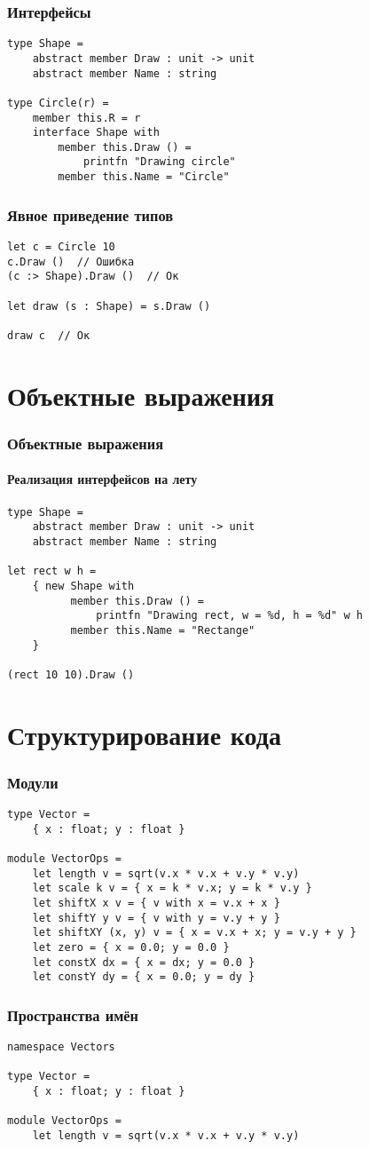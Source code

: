 \documentclass[xetex,mathserif,serif]{beamer}
\begin{document}
	\begin{frame}[fragile]
		\frametitle{Интерфейсы}
		\begin{verbatim}
type Shape =
    abstract member Draw : unit -> unit
    abstract member Name : string

type Circle(r) =
    member this.R = r
    interface Shape with
        member this.Draw () = 
            printfn "Drawing circle"
        member this.Name = "Circle"
		\end{verbatim}
\end{frame}

	\begin{frame}[fragile]
		\frametitle{Явное приведение типов}
		\begin{verbatim}
let c = Circle 10
c.Draw ()  // Ошибка
(c :> Shape).Draw ()  // Ок

let draw (s : Shape) = s.Draw ()

draw c  // Ок
		\end{verbatim}
\end{frame}

	\section{Объектные выражения}

	\begin{frame}[fragile]
		\frametitle{Объектные выражения}
		\framesubtitle{Реализация интерфейсов на лету}
		\begin{verbatim}
type Shape =
    abstract member Draw : unit -> unit
    abstract member Name : string

let rect w h = 
    { new Shape with
          member this.Draw () = 
              printfn "Drawing rect, w = %d, h = %d" w h
          member this.Name = "Rectange"
    }

(rect 10 10).Draw ()
		\end{verbatim}
\end{frame}

	\section{Структурирование кода}

	\begin{frame}[fragile]
		\frametitle{Модули}
		\begin{verbatim}
type Vector =
    { x : float; y : float }

module VectorOps =
    let length v = sqrt(v.x * v.x + v.y * v.y)
    let scale k v = { x = k * v.x; y = k * v.y }
    let shiftX x v = { v with x = v.x + x }
    let shiftY y v = { v with y = v.y + y }
    let shiftXY (x, y) v = { x = v.x + x; y = v.y + y }
    let zero = { x = 0.0; y = 0.0 }
    let constX dx = { x = dx; y = 0.0 }
    let constY dy = { x = 0.0; y = dy }
		\end{verbatim}
\end{frame}

	\begin{frame}[fragile]
		\frametitle{Пространства имён}
		\begin{verbatim}
namespace Vectors

type Vector =
    { x : float; y : float }

module VectorOps =
    let length v = sqrt(v.x * v.x + v.y * v.y)
		\end{verbatim}
\end{frame}
\end{document}
